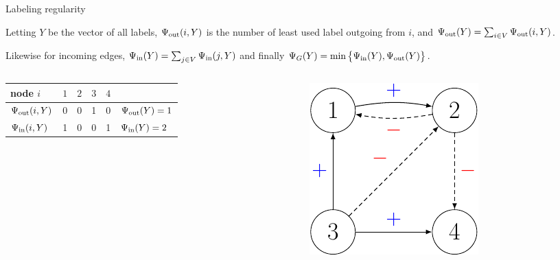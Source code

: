 \documentclass[10pt,svgnames,ignorenonframetext,final]{beamer}
\begin{document}
\begin{frame}{Labeling regularity}


Letting $Y$ be the vector of all labels, $\Psi_{\mathrm{out}}(i, Y)$ is the number of least used label outgoing
from $i$, and $\Psi_{\mathrm{out}}(Y) = \sum_{i \in V} \Psi_{\mathrm{out}}(i,Y)$.

Likewise for incoming edges, \(\Psi_{\mathrm{in}}(Y) = \sum_{j \in V} \Psi_{\mathrm{in}}(j,Y)\) and finally
\(\Psi_G(Y) = \min\big\{\Psi_{\mathrm{in}}(Y), \Psi_{\mathrm{out}}(Y)\big\}\).

\begin{columns}[T]
  \begin{column}{0.6\textwidth}
    \begin{tabular}{lcccc|l}
      \toprule
      node $i$        & $1$ & $2$ & $3$ & $4$ &                  \\
      \midrule
      $\Psi_{\mathrm{out}}(i, Y)$ & 0   & 0   & 1   & 0   & $\Psi_{\mathrm{out}}(Y) = 1$  \\
      $\Psi_{\mathrm{in}}(i, Y)$  & 1   & 0   & 0   & 1   & $\Psi_{\mathrm{in}}(Y) = 2$ \\
      \bottomrule
    \end{tabular}
  \end{column}%
  \hfill%
  \begin{column}{0.39\textwidth}
    \centering \includegraphics[height=.35\textheight]{../assets/raw/g_latex-crop}
  \end{column}%
\end{columns}

\end{frame}
\end{document}
